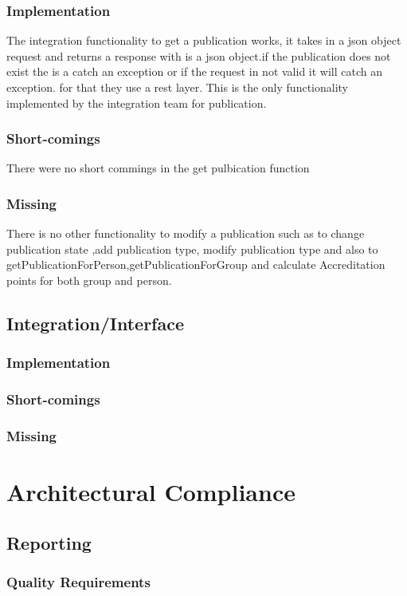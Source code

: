 \documentclass{article}
\begin{document}
		\subsubsection{Implementation}
			The integration functionality to get a publication works, it takes in a json object request and returns a response with is a json object.if the publication does not exist the is a catch an exception or if the request in not valid it will catch an exception. for that they use a rest layer. This is the only functionality implemented by the integration team for publication.
		\subsubsection{Short-comings}
		There were no short commings in the get pulbication function
		\subsubsection{Missing}
		There is no other functionality to modify a publication such as to change publication state ,add publication type, modify publication type and also to getPublicationForPerson,getPublicationForGroup and calculate Accreditation points for both group and person.
		
	\subsection{Integration/Interface}
		\subsubsection{Implementation}
		\subsubsection{Short-comings}
		\subsubsection{Missing}

\section{Architectural Compliance}
	\subsection{Reporting}
		\subsubsection{Quality Requirements}
\end{document}
